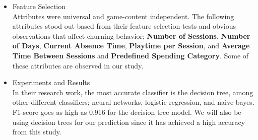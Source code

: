\begin{itemize}
\item Feature Selection \\
Attributes were universal and game-content independent. The following attributes stood out based from their feature selection tests and obvious observations that affect churning behavior; \textbf{Number of Sessions}, \textbf{Number of Days}, \textbf{Current Absence Time}, \textbf{Playtime per Session}, and \textbf{Average Time Between Sessions} and \textbf{Predefined Spending Category}. Some of these attributes are observed in our study.

\item Experiments and Results \\
In their research work, the  most accurate classifier is the decision tree, among other different classifiers; neural networks, logistic regression, and naive bayes. F1-score goes as high as 0.916 for the decision tree model. We will also be using decision trees for our prediction since it has achieved a high accuracy from this study.
\end{itemize}


